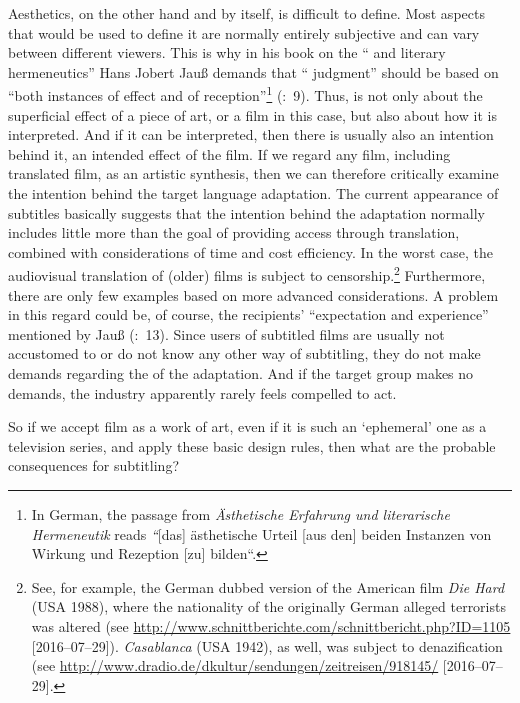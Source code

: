 Aesthetics, on the other hand and by itself, is difficult to define. Most aspects that would be used to define it are normally entirely subjective and can vary between different viewers. This is why in his book on the “ and literary hermeneutics” Hans Jobert Jauß demands that “ judgment” should be based on “both instances of effect and of reception”\footnote{In German, the passage from \textit{Ästhetische Erfahrung und literarische Hermeneutik} reads \textit{“}[das] ästhetische Urteil [aus den] beiden Instanzen von Wirkung und Rezeption [zu] bilden“.} (\citeyear{Jaus1991}:~9). Thus,  is not only about the superficial effect of a piece of art, or a film in this case, but also about how it is interpreted. And if it can be interpreted, then there is usually also an intention behind it, an intended effect of the film. If we regard any film, including translated film, as an artistic synthesis, then we can therefore critically examine the intention behind the target language adaptation. The current appearance of subtitles basically suggests that the intention behind the adaptation normally includes little more than the goal of providing access through translation, combined with considerations of time and cost efficiency. In the worst case, the audiovisual translation of (older) films is subject to censorship.\footnote{See, for example, the German dubbed version of the American film \textit{Die Hard} (USA 1988), where the nationality of the originally German alleged terrorists was altered (see \url{http://www.schnittberichte.com/schnittbericht.php?ID=1105} [2016--07--29]). \textit{Casablanca} (USA 1942), as well, was subject to denazification (see \url{http://www.dradio.de/dkultur/sendungen/zeitreisen/918145/} [2016--07--29].} Furthermore, there are only few examples based on more advanced  considerations. A problem in this regard could be, of course, the recipients’ “expectation and experience” mentioned by Jauß (\citeyear{Jaus1991}:~13). Since users of subtitled films are usually not accustomed to or do not know any other way of subtitling, they do not make demands regarding the  of the adaptation. And if the target group makes no demands, the industry apparently rarely feels compelled to act.



So if we accept film as a work of art, even if it is such an ‘ephemeral’ one as a television series, and apply these basic design rules, then what are the probable consequences for subtitling?


